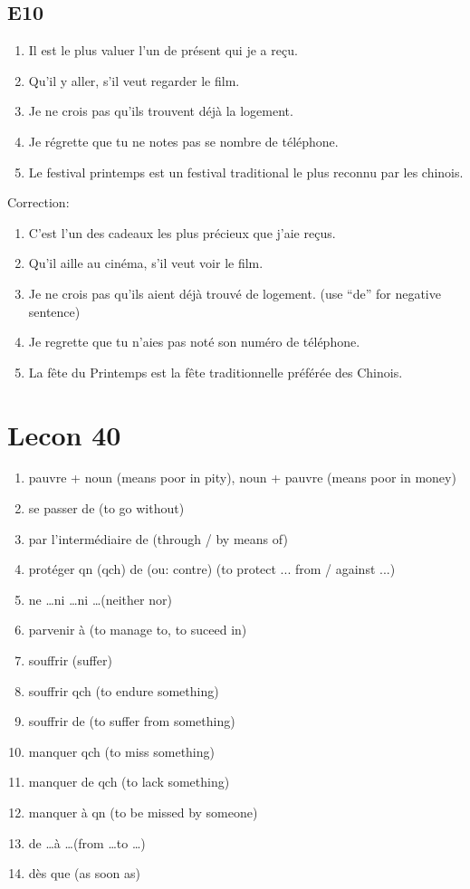 \documentclass{book}
\begin{document}
    \section{E10}
        \begin{enumerate}
            \item Il est le plus valuer l'un de présent qui je a reçu.
            \item Qu'il y aller, s'il veut regarder le film.
            \item Je ne crois pas qu'ils trouvent déjà la logement.
            \item Je régrette que tu ne notes pas se nombre de téléphone.
            \item Le festival printemps est un festival traditional le plus reconnu par les chinois.
        \end{enumerate}
        Correction:
        \begin{enumerate}
            \item C'est l'un des cadeaux les plus précieux que j'aie reçus.
            \item Qu'il aille au cinéma, s'il veut voir le film.
            \item Je ne crois pas qu'ils aient déjà trouvé de logement. (use ``de'' for negative sentence)
            \item Je regrette que tu n'aies pas noté son numéro de téléphone. 
            \item La fête du Printemps est la fête traditionnelle préférée des Chinois.
        \end{enumerate}

\chapter{Lecon 40}
    \begin{enumerate}
        \item pauvre + noun (means poor in pity), noun + pauvre (means poor in money)
        \item se passer de (to go without)
        \item par l'intermédiaire de (through / by means of)
        \item protéger qn (qch) de (ou: contre) (to protect ... from / against ...)
        \item ne \dots ni \dots ni \dots (neither nor)
        \item parvenir à (to manage to, to suceed in)
        \item souffrir (suffer)
        \item souffrir qch (to endure something)
        \item souffrir de (to suffer from something)
        \item manquer qch (to miss something)
        \item manquer de qch (to lack something)
        \item manquer à qn (to be missed by someone)
        \item de \dots à \dots (from \dots to \dots)
        \item dès que (as soon as)
    \end{enumerate}
\end{document}
